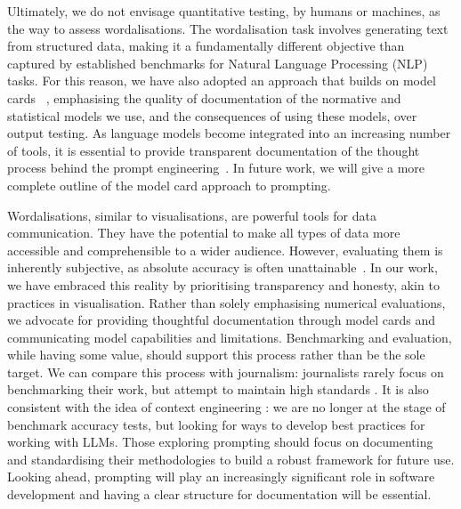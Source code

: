 \documentclass{article}
\begin{document}
Ultimately, we do not envisage quantitative testing, by humans or machines, as the way to assess wordalisations. The wordalisation task involves generating text from structured data, making it a fundamentally different objective than captured by established benchmarks for Natural Language Processing (NLP) tasks. 
 For this reason, we have also adopted an approach that builds on model cards ~\cite{mitchell2019model}, emphasising the quality of documentation of the normative and statistical models we use, and the consequences of using these models, over output testing. As language models become integrated into an increasing number of tools, it is essential to provide transparent documentation of the thought process behind the prompt engineering~\cite{liu2023pre}. In future work, we will give a more complete outline of the model card approach to prompting. 


Wordalisations, similar to visualisations, are powerful tools for data communication. They have the potential to make all types of data more accessible and comprehensible to a wider audience. However, evaluating them is inherently subjective, as absolute accuracy is often unattainable~\cite{tong2021inapplicability, ieee_chatgpt}. In our work, we have embraced this reality by prioritising transparency and honesty, akin to practices in visualisation. Rather than solely emphasising numerical evaluations, we advocate for providing thoughtful documentation through model cards and communicating model capabilities and limitations. Benchmarking and evaluation, while having some value, should support this process rather than be the sole target. We can compare this process with journalism: journalists rarely focus on benchmarking their work, but attempt to maintain high standards \cite{mintzer-sweeney_muth_2024,cairo2016truthful}. It is also consistent with the idea of context engineering \cite{context_engineering}: we are no longer at the stage of benchmark accuracy tests, but looking for ways to develop best practices for working with LLMs. Those exploring prompting should focus on documenting and standardising their methodologies to build a robust framework for future use. Looking ahead, prompting will play an increasingly significant role in software development and having a clear structure for documentation will be essential. 
\end{document}
